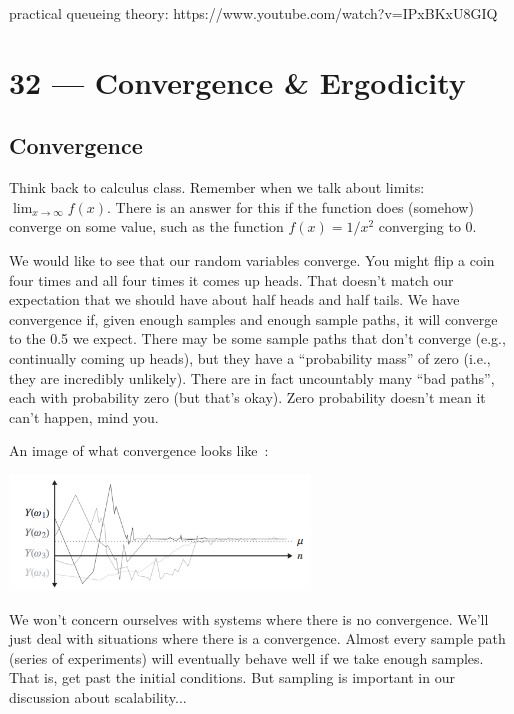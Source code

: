 \documentclass[a4paper]{report}
\begin{document}
practical queueing theory:  https://www.youtube.com/watch?v=IPxBKxU8GIQ





\chapter*{32 --- Convergence \& Ergodicity}


\section*{Convergence}

Think back to calculus class. Remember when we talk about limits: $\lim_{x\to\infty} f(x)$. There is an answer for this if the function does (somehow) converge on some value, such as the function $f(x) = 1/x^{2}$ converging to 0.

We would like to see that our random variables converge. You might flip a coin four times and all four times it comes up heads. That doesn't match our expectation that we should have about half heads and half tails. We have convergence if, given enough samples and enough sample paths, it will converge to the 0.5 we expect. There may be some sample paths that don't converge (e.g., continually coming up heads), but they have a ``probability mass'' of zero (i.e., they are incredibly unlikely).  There are in fact uncountably many ``bad paths'', each with probability zero (but that's okay). Zero probability doesn't mean it can't happen, mind you.

An image of what convergence looks like~\cite{pmd}:

\begin{center}
	\includegraphics[width=0.6\textwidth]{images/convergence.png}
\end{center}

We won't concern ourselves with systems where there is no convergence. We'll just deal with situations where there is a convergence. Almost every sample path (series of experiments) will eventually behave well if we take enough samples. That is, get past the initial conditions. But sampling is important in our discussion about scalability...
\end{document}
